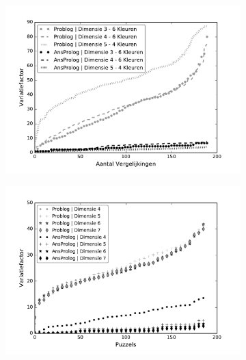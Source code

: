 \documentclass{article}
\begin{document}
\begin{figure}[t]
\centering
\begin{subfigure}{.33\textwidth}
  \centering
  \includegraphics[width=\linewidth]{Grafieken/Variatie/Chromatic Maze/chm.pdf}
  \caption{}
  \label{fig:sub1}
\end{subfigure}%
\begin{subfigure}{.33\textwidth}
  \centering
  \includegraphics[width=\linewidth]{Grafieken/Variatie/Dungeon/dungeon.pdf}
  \caption{}
  \label{fig:sub2}
\end{subfigure}
\begin{subfigure}{.33\textwidth}
  \centering

\end{subfigure}
\end{figure}
\end{document}
